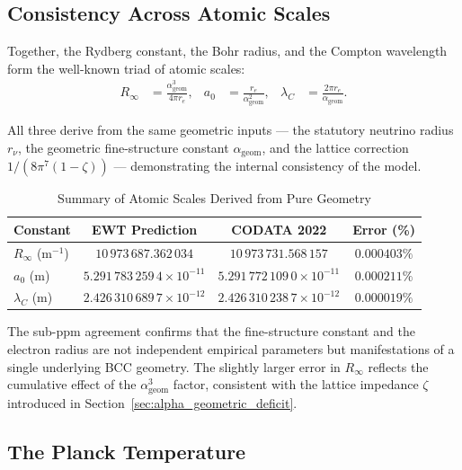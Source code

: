 \documentclass[10pt,a4paper]{article}
\begin{document}
\subsection{Consistency Across Atomic Scales}
\label{sec:atomic_consistency}

Together, the Rydberg constant, the Bohr radius, and the Compton wavelength form the well-known triad of atomic scales:
\begin{align}
	R_\infty &= \frac{\alpha_{\text{geom}}^3}{4\pi r_e},
	&
	a_0      &= \frac{r_e}{\alpha_{\text{geom}}^2},
	&
	\lambda_C &= \frac{2\pi r_e}{\alpha_{\text{geom}}}.
\end{align}

All three derive from the same geometric inputs --- the statutory neutrino radius \(r_\nu\), the geometric fine-structure constant \(\alpha_{\text{geom}}\), and the lattice correction \(1/(8\pi^7(1-\zeta))\) --- demonstrating the internal consistency of the model.

\begin{table}[h!]
	\centering
	\caption{Summary of Atomic Scales Derived from Pure Geometry}
	\label{tab:atomic_scales_summary}
	\begin{tabular}{lccc}
		\toprule
		\textbf{Constant} & \textbf{EWT Prediction} & \textbf{CODATA 2022} & \textbf{Error (\%)} \\
		\midrule
		\(R_\infty\) (\(\text{m}^{-1}\)) & \(10\,973\,687.362\,034\) & \(10\,973\,731.568\,157\) & \(0.000403\%\) \\
		\(a_0\) (\(\text{m}\)) & \(5.291\,783\,259\,4 \times 10^{-11}\) & \(5.291\,772\,109\,0 \times 10^{-11}\) & \(0.000211\%\) \\
		\(\lambda_C\) (\(\text{m}\)) & \(2.426\,310\,689\,7 \times 10^{-12}\) & \(2.426\,310\,238\,7 \times 10^{-12}\) & \(0.000019\%\) \\
		\bottomrule
	\end{tabular}
\end{table}

The sub-ppm agreement confirms that the fine-structure constant and the electron radius are not independent empirical parameters but manifestations of a single underlying BCC geometry. The slightly larger error in \(R_\infty\) reflects the cumulative effect of the \(\alpha_{\text{geom}}^3\) factor, consistent with the lattice impedance \(\zeta\) introduced in Section~\ref{sec:alpha_geometric_deficit}.

\subsection{The Planck Temperature}
\label{sec:planck_temperature}
\end{document}
